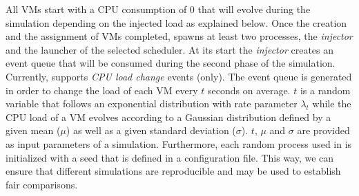 %
All VMs start with a CPU consumption of 0 that will evolve during the
simulation depending on the injected load as explained below.
%
Once the creation and the assignment of VMs completed, \vmps spawns at
least two \sg processes, the \emph{injector} and the launcher of the
selected scheduler.  At its start the \emph{injector}
creates an event queue that will be consumed during the second phase
of the simulation.  Currently, \vmps supports \emph{CPU
  load change} events (only).
%
The event queue is generated in order to change the load of each VM
every $t$ seconds on average. $t$ is a random variable that follows an
exponential distribution with rate parameter $\lambda_t$ while the CPU
load of a VM evolves according to a Gaussian distribution defined by a
given mean ($\mu$) as well as a given standard deviation
($\sigma$). $t$, $\mu$ and $\sigma$ are provided as input parameters
of a simulation.
Furthermore, each random process used in \vmps is initialized with a
seed that is defined in a configuration file. This way, we can ensure
that different simulations are reproducible and may be used to
establish fair comparisons.

